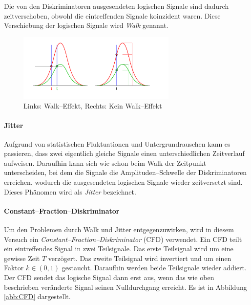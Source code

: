 \documentclass[12pt,a4paper]{scrartcl}
\numberwithin{equation}{section} %
\begin{document}
Die von den Diskriminatoren ausgesendeten logischen Signale sind dadurch zeitverschoben, obwohl die eintreffenden Signale koinzident waren. Diese Verschiebung der logischen Signale wird \emph{Walk} genannt.

\begin{figure}[h]
	\centering
	\includegraphics[width=0.7\textwidth]{../media/B3.4/Constant_fraction_1.pdf}
	\caption{Links: Walk--Effekt, Rechts: Kein Walk--Effekt \cite{abb:Constant_fraction}}
	\label{abb:Walk-Effekt}
\end{figure}

\hypertarget{jitter}{%
\paragraph{Jitter}\label{jitter}}

Aufgrund von statistischen Fluktuationen und Untergrundrauschen kann es passieren, dass zwei eigentlich gleiche Signale einen unterschiedlichen Zeitverlauf aufweisen. Daraufhin kann sich wie schon beim Walk der Zeitpunkt unterscheiden, bei dem die Signale die Amplituden--Schwelle der Diskriminatoren erreichen, wodurch die ausgesendeten logischen Signale wieder zeitversetzt sind. Dieses Phänomen wird als \emph{Jitter} bezeichnet.

\hypertarget{cfd}{%
\paragraph{Constant--Fraction--Diskriminator}\label{cfd}}

Um den Problemen durch Walk und Jitter entgegenzuwirken, wird in diesem Versuch ein \emph{Constant--Fraction--Diskriminator} (CFD) verwendet. Ein CFD teilt ein eintreffendes Signal in zwei Teilsignale. Das erste Teilsignal wird um eine gewisse Zeit $T$ verzögert. Das zweite Teilsignal wird invertiert und um einen Faktor $k\in(0, 1)$ gestaucht. Daraufhin werden beide Teilsignale wieder addiert. Der CFD sendet das logische Signal dann erst aus, wenn das wie oben beschrieben veränderte Signal seinen Nulldurchgang erreicht. Es ist in Abbildung \ref{abb:CFD} dargestellt.
\end{document}
